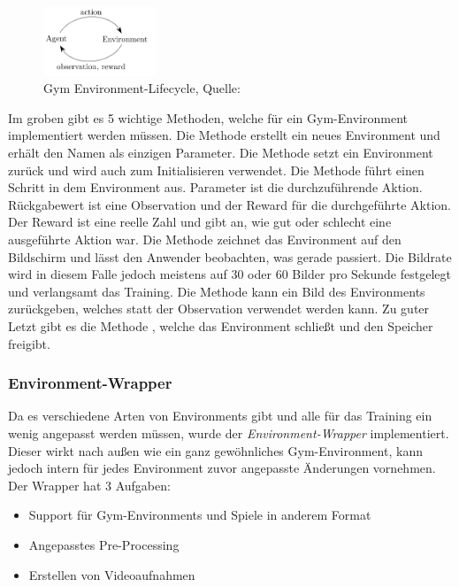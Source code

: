 \documentclass[12pt,a4paper]{article}
\begin{document}
\begin{figure}[!h]
	\centering
	\includegraphics[width=0.3\textwidth]{gfx/gym_env}
	\caption{Gym Environment-Lifecycle, Quelle: \cite{gym:doc:env}}
	\label{fig:pract:framework:gymenv}
\end{figure}

Im groben gibt es 5 wichtige Methoden, welche für ein Gym-Environment implementiert werden müssen.
Die Methode  erstellt ein neues Environment und erhält den Namen als einzigen Parameter.
Die Methode  setzt ein Environment zurück und wird auch zum Initialisieren verwendet.
Die Methode  führt einen Schritt in dem Environment aus. Parameter ist die durchzuführende Aktion.
Rückgabewert ist eine Observation und der Reward für die durchgeführte Aktion.
Der Reward ist eine reelle Zahl und gibt an, wie gut oder schlecht eine ausgeführte Aktion war.
Die Methode  zeichnet das Environment auf den Bildschirm und lässt den Anwender beobachten, was gerade passiert.
Die Bildrate wird in diesem Falle jedoch meistens auf 30 oder 60 Bilder pro Sekunde festgelegt und verlangsamt das Training.
Die Methode kann ein Bild des Environments zurückgeben, welches statt der Observation verwendet werden kann.
Zu guter Letzt gibt es die Methode , welche das Environment schließt und den Speicher freigibt.

\subsubsection{Environment-Wrapper}
Da es verschiedene Arten von Environments gibt und alle für das Training ein wenig angepasst werden müssen, wurde der \textit{Environment-Wrapper} implementiert.
Dieser wirkt nach außen wie ein ganz gewöhnliches Gym-Environment, kann jedoch intern für jedes Environment zuvor angepasste Änderungen vornehmen.
Der Wrapper hat 3 Aufgaben:
\begin{itemize}
	\item Support für Gym-Environments und Spiele in anderem Format
	\item Angepasstes Pre-Processing
	\item Erstellen von Videoaufnahmen
\end{itemize}
\end{document}
